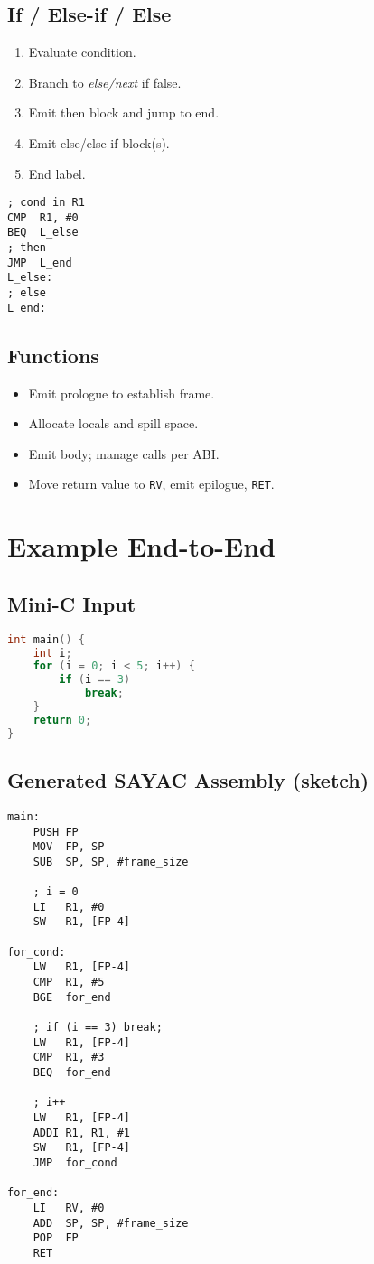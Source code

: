 \documentclass[12pt,a4paper]{report}
\begin{document}
\subsection{If / Else-if / Else}
\begin{enumerate}
    \item Evaluate condition.
    \item Branch to \emph{else/next} if false.
    \item Emit then block and jump to end.
    \item Emit else/else-if block(s).
    \item End label.
\end{enumerate}
\begin{lstlisting}[language=SAYACasm, style=code]
; cond in R1
CMP  R1, #0
BEQ  L_else
; then
JMP  L_end
L_else:
; else
L_end:
\end{lstlisting}

\subsection{Functions}
\begin{itemize}
    \item Emit prologue to establish frame.
    \item Allocate locals and spill space.
    \item Emit body; manage calls per ABI.
    \item Move return value to \texttt{RV}, emit epilogue, \texttt{RET}.
\end{itemize}

\section{Example End-to-End}
\subsection*{Mini-C Input}
\begin{lstlisting}[language=C, style=code]
int main() {
    int i;
    for (i = 0; i < 5; i++) {
        if (i == 3)
            break;
    }
    return 0;
}
\end{lstlisting}

\subsection*{Generated SAYAC Assembly (sketch)}
\begin{lstlisting}[language=SAYACasm, style=code]
main:
    PUSH FP
    MOV  FP, SP
    SUB  SP, SP, #frame_size

    ; i = 0
    LI   R1, #0
    SW   R1, [FP-4]

for_cond:
    LW   R1, [FP-4]
    CMP  R1, #5
    BGE  for_end

    ; if (i == 3) break;
    LW   R1, [FP-4]
    CMP  R1, #3
    BEQ  for_end

    ; i++
    LW   R1, [FP-4]
    ADDI R1, R1, #1
    SW   R1, [FP-4]
    JMP  for_cond

for_end:
    LI   RV, #0
    ADD  SP, SP, #frame_size
    POP  FP
    RET
\end{lstlisting}
\end{document}
